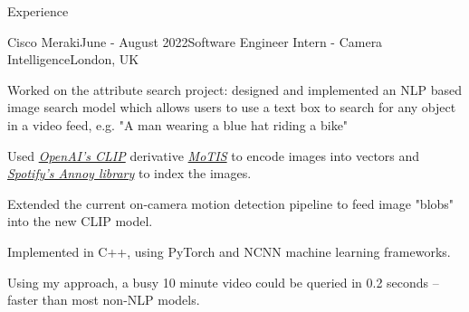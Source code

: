 \documentclass{structure}
\begin{document}
\begin{rSection}{Experience}

\begin{rSubsection}{Cisco Meraki}{June - August 2022}{Software Engineer Intern - Camera Intelligence}{London, UK}{}
    \item Worked on the attribute search project: designed and implemented an 
    NLP based image search model which allows users to use a text box to 
    search for any object in a video feed, e.g. "A man wearing a blue hat riding a bike"
    \item Used \emph{\href{https://openai.com/blog/clip/}{OpenAI's CLIP}} derivative
    \emph{\href{https://github.com/DRSY/MoTIS}{MoTIS}} to encode images into vectors and
    \emph{\href{https://github.com/spotify/annoy}{Spotify's Annoy library}} to index the images.
    \item Extended the current on-camera motion detection pipeline to feed image "blobs" into the new CLIP model.
    \item Implemented in C++, using PyTorch and NCNN machine learning frameworks.
    \item Using my approach, a busy 10 minute video could be queried in 0.2 seconds --
    faster than most non-NLP models.
    \item \href{https://gist.githubusercontent.com/tom-pollak/1a2e8c1fc61ba269e25c73c02c78007c/raw/45c8cbceda8cd745d6d00cb16a09979778df663b/gistfile1.txt}{\color{blue}{Reference}}
\end{rSubsection}
\end{rSection}

\end{document}
